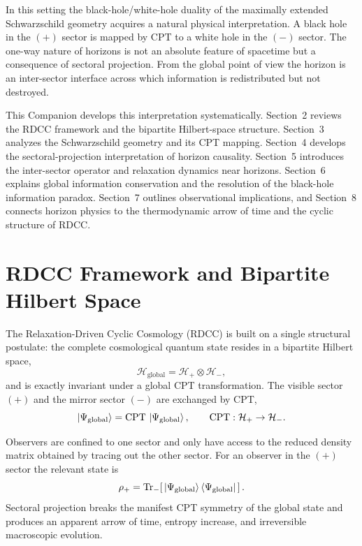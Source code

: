 \documentclass[11pt,a4paper]{article}
\begin{document}
In this setting the black-hole/white-hole duality of the maximally extended Schwarzschild
geometry acquires a natural physical interpretation. A black hole in the $(+)$ sector is
mapped by CPT to a white hole in the $(-)$ sector. The one-way nature of horizons is
not an absolute feature of spacetime but a consequence of sectoral projection. From the
global point of view the horizon is an inter-sector interface across which information is
redistributed but not destroyed.

This Companion develops this interpretation systematically. Section~2 reviews the RDCC
framework and the bipartite Hilbert-space structure. Section~3 analyzes the Schwarzschild
geometry and its CPT mapping. Section~4 develops the sectoral-projection interpretation
of horizon causality. Section~5 introduces the inter-sector operator and relaxation
dynamics near horizons. Section~6 explains global information conservation and the
resolution of the black-hole information paradox. Section~7 outlines observational
implications, and Section~8 connects horizon physics to the thermodynamic arrow of
time and the cyclic structure of RDCC.


\section{RDCC Framework and Bipartite Hilbert Space}

The Relaxation-Driven Cyclic Cosmology (RDCC) is built on a single structural postulate:
the complete cosmological quantum state resides in a bipartite Hilbert space,
\begin{equation}
\mathcal{H}_{\mathrm{global}} = \mathcal{H}_{+} \otimes \mathcal{H}_{-},
\end{equation}
and is exactly invariant under a global CPT transformation. The visible sector $(+)$ and
the mirror sector $(-)$ are exchanged by CPT,
\begin{equation}
\ket{\Psi_{\mathrm{global}}}
=
\mathrm{CPT}\,\ket{\Psi_{\mathrm{global}}},
\qquad
\mathrm{CPT}:\mathcal{H}_{+}\rightarrow\mathcal{H}_{-}.
\end{equation}

Observers are confined to one sector and only have access to the reduced density matrix
obtained by tracing out the other sector. For an observer in the $(+)$ sector the relevant
state is
\begin{equation}
\rho_{+} = \mathrm{Tr}_{-}\!\left[\,\ket{\Psi_{\mathrm{global}}}\bra{\Psi_{\mathrm{global}}}\,\right].
\end{equation}
Sectoral projection breaks the manifest CPT symmetry of the global state and produces
an apparent arrow of time, entropy increase, and irreversible macroscopic evolution.
\end{document}
